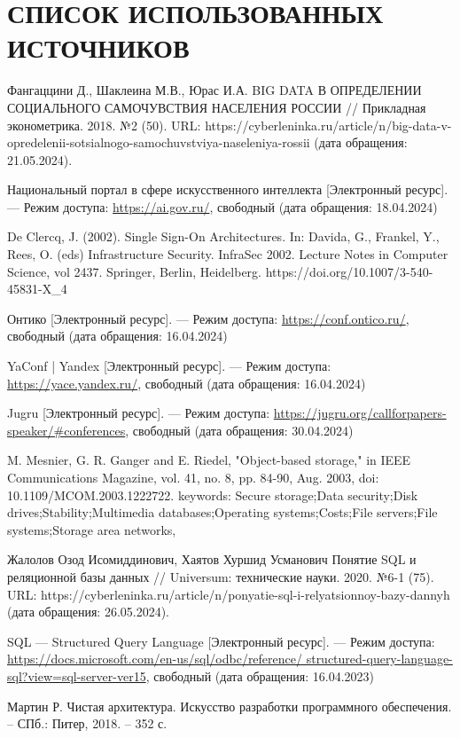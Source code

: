 \section*{СПИСОК ИСПОЛЬЗОВАННЫХ ИСТОЧНИКОВ}

\begingroup
\renewcommand{\section}[2]{}
\begin{thebibliography}{}
	
	Фангаццини Д., Шаклеина М.В., Юрас И.А. BIG DATA В ОПРЕДЕЛЕНИИ СОЦИАЛЬНОГО САМОЧУВСТВИЯ НАСЕЛЕНИЯ РОССИИ // Прикладная эконометрика. 2018. №2 (50). URL: https://cyberleninka.ru/article/n/big-data-v-opredelenii-sotsialnogo-samochuvstviya-naseleniya-rossii (дата обращения: 21.05.2024).
	
	Национальный портал в сфере искусственного интеллекта [Электронный ресурс]. --- Режим доступа: \url{https://ai.gov.ru/}, свободный (дата обращения: 18.04.2024)
	
	De Clercq, J. (2002). Single Sign-On Architectures. In: Davida, G., Frankel, Y., Rees, O. (eds) Infrastructure Security. InfraSec 2002. Lecture Notes in Computer Science, vol 2437. Springer, Berlin, Heidelberg. https://doi.org/10.1007/3-540-45831-X{\_}4
	
	Онтико  [Электронный ресурс]. --- Режим доступа: \url{https://conf.ontico.ru/}, свободный (дата обращения: 16.04.2024)
	
	YaConf | Yandex [Электронный ресурс]. --- Режим доступа: \url{https://yace.yandex.ru/}, свободный (дата обращения: 16.04.2024)
	
	Jugru [Электронный ресурс]. --- Режим доступа: \url{https://jugru.org/callforpapers-speaker/#conferences}, свободный (дата обращения: 30.04.2024)
	
	M. Mesnier, G. R. Ganger and E. Riedel, "Object-based storage," in IEEE Communications Magazine, vol. 41, no. 8, pp. 84-90, Aug. 2003, doi: 10.1109/MCOM.2003.1222722. keywords: {Secure storage;Data security;Disk drives;Stability;Multimedia databases;Operating systems;Costs;File servers;File systems;Storage area networks},
	
	Жалолов Озод Исомиддинович, Хаятов Хуршид Усманович Понятие SQL и реляционной базы данных // Universum: технические науки. 2020. №6-1 (75). URL: https://cyberleninka.ru/article/n/ponyatie-sql-i-relyatsionnoy-bazy-dannyh (дата обращения: 26.05.2024).
	
	SQL --- Structured Query Language  [Электронный ресурс]. --- Режим доступа: \url{https://docs.microsoft.com/en-us/sql/odbc/reference/ structured-query-language-sql?view=sql-server-ver15}, свободный (дата обращения: 16.04.2023)
	
	Мартин Р. Чистая архитектура. Искусство разработки программного обеспечения. – СПб.: Питер, 2018. – 352 с.
	

\end{thebibliography}	
	\endgroup
	
	\pagebreak
